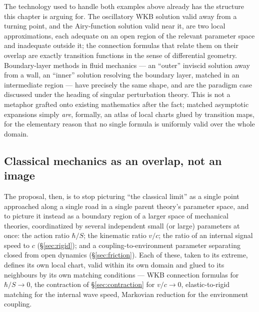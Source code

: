 \documentclass[11pt]{book}
\begin{document}
The technology used to handle both examples above already has the structure this chapter is arguing for. The oscillatory WKB solution valid away from a turning point, and the Airy-function solution valid near it, are two local approximations, each adequate on an open region of the relevant parameter space and inadequate outside it; the connection formulas that relate them on their overlap are exactly transition functions in the sense of differential geometry. Boundary-layer methods in fluid mechanics --- an ``outer'' inviscid solution away from a wall, an ``inner'' solution resolving the boundary layer, matched in an intermediate region --- have precisely the same shape, and are the paradigm case discussed under the heading of singular perturbation theory. This is not a metaphor grafted onto existing mathematics after the fact; matched asymptotic expansions simply \emph{are}, formally, an atlas of local charts glued by transition maps, for the elementary reason that no single formula is uniformly valid over the whole domain.

\subsection{Classical mechanics as an overlap, not an image}

The proposal, then, is to stop picturing ``the classical limit'' as a single point approached along a single road in a single parent theory's parameter space, and to picture it instead as a boundary region of a larger space of mechanical theories, coordinatized by several independent small (or large) parameters at once: the action ratio $\hbar/S$; the kinematic ratio $v/c$; the ratio of an internal signal speed to $c$ (\S\ref{sec:rigid}); and a coupling-to-environment parameter separating closed from open dynamics (\S\ref{sec:friction}). Each of these, taken to its extreme, defines its own local chart, valid within its own domain and glued to its neighbours by its own matching conditions --- WKB connection formulas for $\hbar/S\to 0$, the contraction of \S\ref{sec:contraction} for $v/c\to 0$, elastic-to-rigid matching for the internal wave speed, Markovian reduction for the environment coupling.
\end{document}
